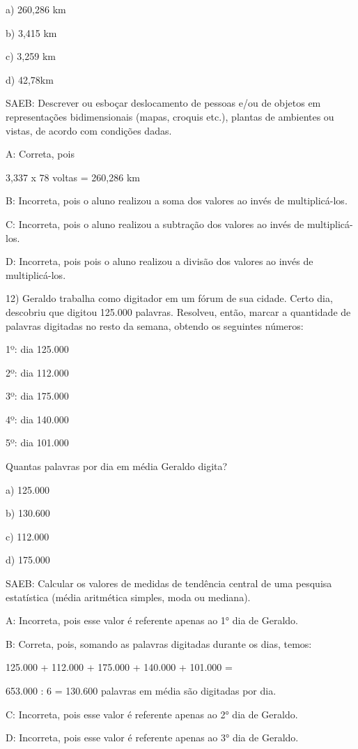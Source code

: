 a) 260,286 km

b) 3,415 km

c) 3,259 km

d) 42,78km

SAEB: Descrever ou esboçar deslocamento de pessoas e/ou de objetos em
representações bidimensionais (mapas, croquis etc.), plantas de
ambientes ou vistas, de acordo com condições dadas.

A: Correta, pois

3,337 x 78 voltas = 260,286 km

B: Incorreta, pois o aluno realizou a soma dos valores ao invés de
multiplicá-los.

C: Incorreta, pois o aluno realizou a subtração dos valores ao invés de
multiplicá-los.

D: Incorreta, pois pois o aluno realizou a divisão dos valores ao invés
de multiplicá-los.

12) Geraldo trabalha como digitador em um fórum de sua cidade. Certo
dia, descobriu que digitou 125.000 palavras. Resolveu, então, marcar a
quantidade de palavras digitadas no resto da semana, obtendo os
seguintes números:

1º: dia 125.000

2º: dia 112.000

3º: dia 175.000

4º: dia 140.000

5º: dia 101.000

Quantas palavras por dia em média Geraldo digita?

a) 125.000

b) 130.600

c) 112.000

d) 175.000

SAEB: Calcular os valores de medidas de tendência central de uma
pesquisa estatística (média aritmética simples, moda ou mediana).

A: Incorreta, pois esse valor é referente apenas ao 1° dia de Geraldo.

B: Correta, pois, somando as palavras digitadas durante os dias, temos:

125.000 + 112.000 + 175.000 + 140.000 + 101.000 =

653.000 : 6 = 130.600 palavras em média são digitadas por dia.

C: Incorreta, pois esse valor é referente apenas ao 2° dia de Geraldo.

D: Incorreta, pois esse valor é referente apenas ao 3° dia de Geraldo.

